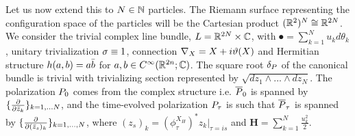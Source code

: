 \documentclass[notas.tex]{subfiles}
\begin{document}
Let us now extend this to $N \in \mathbb{N}$ particles. The Riemann surface representing the configuration space of the particles will be the Cartesian product $(\mathbb{R}^2)^N \cong \mathbb{R}^{2N}$. We consider the trivial complex line bundle, $L = \mathbb{R}^{2N} \times \mathbb{C}$, with $\spot = \sum_{k=1}^{N} u_k d\theta_k$, unitary trivialization $\sigma \equiv 1$, connection $\nabla_{X} = X + i \vartheta(X)$ and Hermitian structure $h(a,b) = a \bar b$ for $a, b \in C^\infty(\mathbb{R}^{2n}; \mathbb{C})$. The square root $\delta_P$ of the canonical bundle is trivial with trivializing section represented by $\sqrt{dz_1 \wedge ... \wedge dz_N}$. The polarization $P_0$ comes from the complex structure i.e. $\overline {P}_0$ is spanned by $\{\frac{\partial }{\partial \bar z_k}\}_{k=1,...N}$, and the time-evolved polarization $P_\tau$ is such that $\overline {P}_\tau$ is spanned by $\{\frac{\partial }{\partial (\bar z_{s})_k}\}_{k=1,...,N}$, where $(z_{s})_k = \left ( \phi_{\tau}^{X_H} \right )^* z_k \big|_{\tau=is}$ and $\bm{H} = \sum_{k=1}^{N} \frac{u_k^2}{2}$. 
\end{document}
